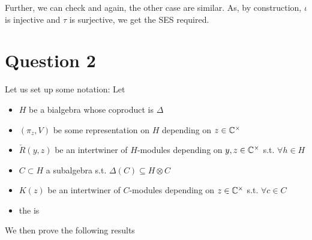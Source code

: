 \documentclass{article}
\begin{document}
Further, we can check 
and again, the other case are similar. As, by construction, $\iota$ is injective and $\tau$ is surjective, we get the SES required. 

\section{Question 2}

Let us set up some notation: Let
\begin{itemize}
    \item $H$ be a bialgebra whose coproduct is $\Delta$
    \item $(\pi_z,V)$ be some representation on $H$ depending on $z\in\mathbb{C}^\times$ 
    \item $\check{R}(y,z)$ be an intertwiner of $H$-modules depending on $y,z \in \mathbb{C}^\times$ s.t. $\forall h \in H$
    \item $C \subset H$ a subalgebra s.t. $\Delta(C) \subseteq H \otimes C$ 
    \item $K(z)$ be an intertwiner of $C$-modules depending on $z \in \mathbb{C}^\times$ s.t. $\forall c \in C$
    \item the  is 
\end{itemize}

We then prove the following results 
\end{document}
